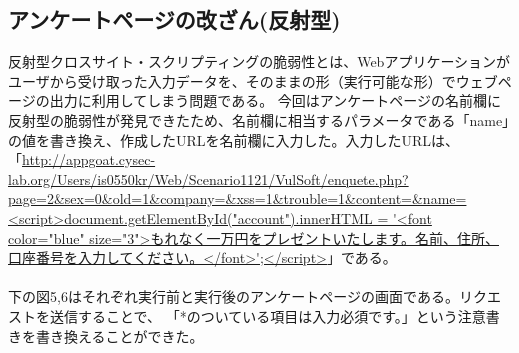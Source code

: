 \documentclass[dvipdfmx,autodetect-engine,titlepage]{jsarticle}
\begin{document}
\subsection{アンケートページの改ざん(反射型)}
反射型クロスサイト・スクリプティングの脆弱性とは、Webアプリケーションがユーザから受け取った入力データを、そのままの形（実行可能な形）でウェブページの出力に利用してしまう問題である。
今回はアンケートページの名前欄に反射型の脆弱性が発見できたため、名前欄に相当するパラメータである「name」の値を書き換え、作成したURLを名前欄に入力した。入力したURLは、「\url{http://appgoat.cysec-lab.org/Users/is0550kr/Web/Scenario1121/VulSoft/enquete.php?page=2&sex=0&old=1&company=&xss=1&trouble=1&content=&name=<script>document.getElementById("account").innerHTML = '<font color="blue" size="3">もれなく一万円をプレゼントいたします。名前、住所、口座番号を入力してください。</font>';</script>}」である。\\\\
下の図5,6はそれぞれ実行前と実行後のアンケートページの画面である。リクエストを送信することで、
「*のついている項目は入力必須です。」という注意書きを書き換えることができた。\\
\end{document}
